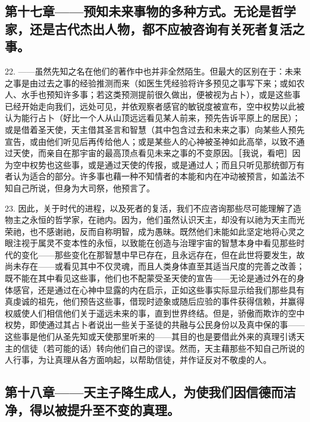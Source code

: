 
\subsection{第十七章——预知未来事物的多种方式。无论是哲学家，还是古代杰出人物，都不应被咨询有关死者复活之事。}

22. ——虽然先知之名在他们的著作中也并非全然陌生。但最大的区别在于：未来之事是由过去之事的经验推测而来（如医生凭经验将许多预见之事写下来；或如农人、水手也预知许多事；若这类预测提前很久做出，便被视为占卜），或是这些事已经开始走向我们，远处可见，并依观察者感官的敏锐度被宣布，空中权势以此被认为能行占卜（好比一个人从山顶远远看见某人前来，预先告诉平原上的居民）；或是借着圣天使，天主借其圣言和智慧（其中包含过去和未来之事）向某些人预先宣告，或由他们听见后再传给他人；或是某些人的心神被圣神如此高举，以致不通过天使，而亲自在那宇宙的最高顶点看见未来之事的不变原因。［我说，看吧］因为空中权势也这些事，或是通过天使的传报，或是通过人；而且只听见那统御万有者认为适合的部分。许多事也藉一种不知情者的本能和内在冲动被预言，如盖法不知自己所说，但身为大司祭，他预言了。\par

23. 因此，关于时代的进程，以及死者的复活，我们不应咨询那些尽可能理解了造物主之永恒的哲学家，在祂内。因为，他们虽然认识天主，却没有以祂为天主而光荣祂，也不感谢祂，反而自称明智，成为愚昧。既然他们未能如此坚定地将心灵之眼注视于属灵不变本性的永恒，以致能在创造与治理宇宙的智慧本身中看见那些时代的变化——那些变化在那智慧中早已存在，且永远存在，但在此世将要发生，故尚未存在——或看见其中不仅灵魂，而且人类身体直至其适当尺度的完善之改善；既不能在其中看见这些事，他们也不配蒙受圣天使的宣告——无论是通过外在的身体感官，还是通过在心神中显露的内在启示，正如这些事实际显示给我们那些具有真虔诚的祖先，他们预告这些事，借现时迹象或随后应验的事件获得信赖，并赢得权威使人们相信他们关于遥远未来的事，直到世界终结。但是，骄傲而欺诈的空中权势，即使通过其占卜者说出一些关于圣徒的共融与公民身份以及真中保的事——这些事是他们从圣先知或天使那里听来的——其目的也是要借此外来的真理引诱天主的信徒（若可能的话）转向他们自己的谬误。然而，天主藉那些不知自己所说的人行事，为让真理从各方面响起，以帮助信徒，并作证反对不敬虔的人。\par


\subsection{第十八章——天主子降生成人，为使我们因信德而洁净，得以被提升至不变的真理。}

